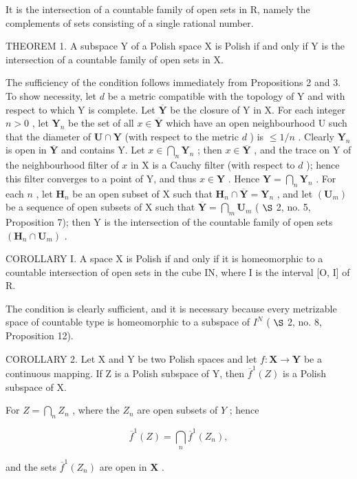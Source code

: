 It is the intersection of a countable family of open sets in R, namely the complements of sets consisting of a single rational number.

THEOREM 1. A subspace Y of a Polish space X is Polish if and only if Y is the intersection of a countable family of open sets in X.

The sufficiency of the condition follows immediately from Propositions 2 and 3. To show necessity, let \(d\) be a metric compatible with the topology of Y and with respect to which Y is complete. Let \(\overline{\mathbf{Y}}\) be the closure of Y in X. For each integer \(n>0\) , let \(\mathbf{Y}_{n}\) be the set of all \(x\in\overline{\mathbf{Y}}\) which have an open neighbourhood U such that the diameter of \(\mathbf{U}\cap\mathbf{Y}\) (with respect to the metric \(d\) ) is \(\leqslant1/n\) . Clearly \(\mathbf{Y}_{n}\) is open in \(\overline{\mathbf{Y}}\) and contains Y. Let \(x\in\bigcap_{n}\mathbf{Y}_{n}\) ; then \(x\in\overline{\mathbf{Y}}\) , and the trace on Y of the neighbourhood filter of \(x\) in X is a Cauchy filter (with respect to \(d\) ); hence this filter converges to a point of Y, and thus \(x\in\mathbf{Y}\) . Hence \(\mathbf{Y}=\bigcap_{n}\mathbf{Y}_{n}\) . For each \(n\) , let \(\mathbf{H}_{n}\) be an open subset of X such that \(\mathbf{H}_{n}\cap\overline{\mathbf{Y}}=\mathbf{Y}_{n}\) , and let \((\mathbf{U}_{m})\) be a sequence of open subsets of X such that \(\overline{\mathbf{Y}}=\bigcap_{m}\mathbf{U}_{m}\) ( \(\S\) 2, no. 5, Proposition 7); then Y is the intersection of the countable family of open sets \((\mathbf{H}_{n}\cap\mathbf{U}_{m})\) .

COROLLARY I. A space X is Polish if and only if it is homeomorphic to a countable intersection of open sets in the cube IN, where I is the interval {[}O, I{]} of R.

The condition is clearly sufficient, and it is necessary because every metrizable space of countable type is homeomorphic to a subspace of \(I^{N}\) ( \(\S\) 2, no. 8, Proposition 12).

COROLLARY 2. Let X and Y be two Polish spaces and let \(f: \mathbf{X} \to \mathbf{Y}\) be a continuous mapping. If Z is a Polish subspace of Y, then \(\overline{f}^{1}(Z)\) is a Polish subspace of X.

For \(Z = \bigcap_{n} Z_n\) , where the \(Z_n\) are open subsets of \(Y\) ; hence

\[
\overline {{{f}}} ^ {1} (Z) = \bigcap_ {n} \overline {{{f}}} ^ {1} (Z _ {n}),
\]

and the sets \(\overline{f}^1 (Z_n)\) are open in \(\mathbf{X}\) .

